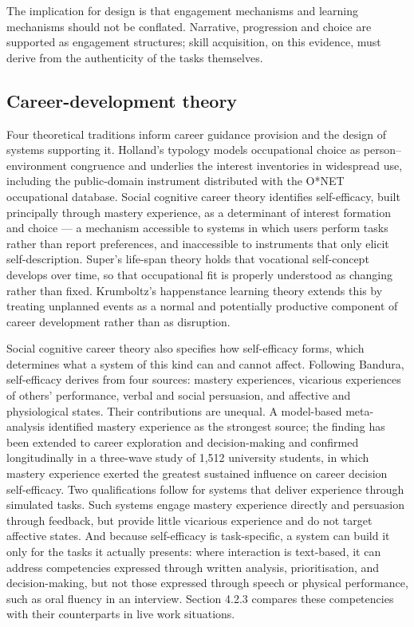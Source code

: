 The implication for design is that engagement mechanisms and learning mechanisms should not be conflated. Narrative, progression and choice are supported as engagement structures; skill acquisition, on this evidence, must derive from the authenticity of the tasks themselves.

\subsection{Career-development theory}

Four theoretical traditions inform career guidance provision and the design of systems supporting it. Holland's typology\cite{r41} models occupational choice as person--environment congruence and underlies the interest inventories in widespread use, including the public-domain instrument distributed with the O*NET occupational database. Social cognitive career theory\cite{r10,r42} identifies self-efficacy, built principally through mastery experience, as a determinant of interest formation and choice --- a mechanism accessible to systems in which users perform tasks rather than report preferences, and inaccessible to instruments that only elicit self-description. Super's life-span theory\cite{r43} holds that vocational self-concept develops over time, so that occupational fit is properly understood as changing rather than fixed. Krumboltz's happenstance learning theory\cite{r44} extends this by treating unplanned events as a normal and potentially productive component of career development rather than as disruption.

Social cognitive career theory also specifies how self-efficacy forms, which determines what a system of this kind can and cannot affect. Following Bandura\cite{r45}, self-efficacy derives from four sources: mastery experiences, vicarious experiences of others' performance, verbal and social persuasion, and affective and physiological states. Their contributions are unequal. A model-based meta-analysis identified mastery experience as the strongest source\cite{r11}; the finding has been extended to career exploration and decision-making\cite{r46} and confirmed longitudinally in a three-wave study of 1,512 university students, in which mastery experience exerted the greatest sustained influence on career decision self-efficacy\cite{r47}. Two qualifications follow for systems that deliver experience through simulated tasks. Such systems engage mastery experience directly and persuasion through feedback, but provide little vicarious experience and do not target affective states. And because self-efficacy is task-specific, a system can build it only for the tasks it actually presents: where interaction is text-based, it can address competencies expressed through written analysis, prioritisation, and decision-making, but not those expressed through speech or physical performance, such as oral fluency in an interview. Section 4.2.3 compares these competencies with their counterparts in live work situations.

